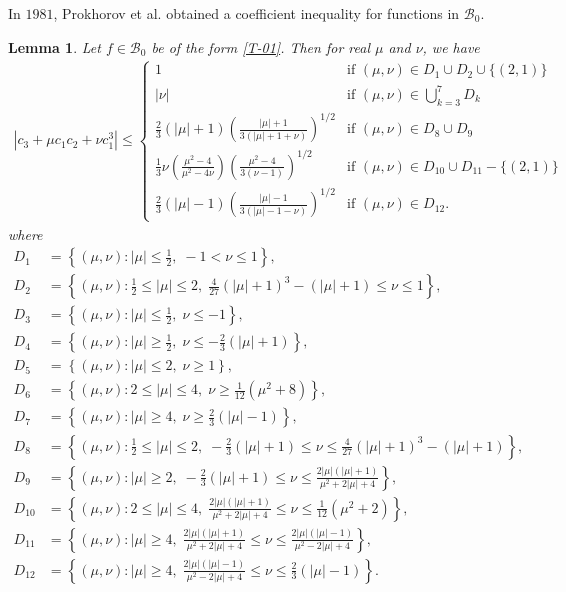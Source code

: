 \documentclass[a4paper,12pt]{amsart}
\newtheorem{lem}{Lemma}[section]
\theoremstyle{definition}
\begin{document}
In $1981$, Prokhorov et al. \cite{1981-Prokhorov-szynal} obtained a coefficient inequality for functions in $\mathcal{B}_0$.
\begin{lem}\label{T-34}\cite{1981-Prokhorov-szynal}
Let $f\in\mathcal{B}_0$ be of the form \eqref{T-01}. Then for real $\mu$ and $\nu$, we have
\begin{align*}
|c_3+\mu c_1c_2+\nu c_1^3|\le
\begin{cases} 
1 & \text{if } (\mu, \nu) \in D_1 \cup D_2 \cup \{ (2, 1) \} \\
|\nu| & \text{if } (\mu, \nu) \in \bigcup_{k=3}^{7} D_k \\
\frac{2}{3} \left( |\mu| + 1 \right) \left( \frac{|\mu| + 1}{3(|\mu| + 1 +\nu)} \right)^{1/2} & \text{if } (\mu, \nu) \in D_8 \cup D_9 \\
\frac{1}{3} \nu \left( \frac{\mu^2 - 4}{\mu^2 - 4\nu} \right) \left( \frac{\mu^2 - 4}{3(\nu - 1)} \right)^{1/2} & \text{if } (\mu, \nu) \in D_{10} \cup D_{11} - \{ (2, 1) \} \\
\frac{2}{3} \left( |\mu| - 1 \right) \left( \frac{|\mu| - 1}{3(|\mu| - 1 - \nu)} \right)^{1/2} & \text{if } (\mu, \nu) \in D_{12}.
\end{cases}
\end{align*}
where 
\allowdisplaybreaks
\begin{align*}
D_1 &= \left\{ (\mu, \nu): |\mu| \leq \frac{1}{2},\; -1 < \nu \leq 1 \right\}, \\
D_2 &= \left\{ (\mu, \nu): \frac{1}{2} \leq |\mu| \leq 2,\; \frac{4}{27} (|\mu| + 1)^3 - (|\mu| + 1) \leq \nu \leq 1 \right\}, \\
D_3 &= \left\{ (\mu, \nu): |\mu| \leq \frac{1}{2},\; \nu \leq -1 \right\}, \\
D_4 &= \left\{ (\mu, \nu): |\mu| \geq \frac{1}{2},\; \nu \leq -\frac{2}{3} (|\mu| + 1) \right\}, \\
D_5 &= \left\{ (\mu, \nu): |\mu| \leq 2,\; \nu \geq 1 \right\}, \\
D_6 &= \left\{ (\mu, \nu): 2 \leq |\mu| \leq 4,\; \nu \geq \frac{1}{12} (\mu^2 + 8) \right\}, \\
D_7 &= \left\{ (\mu, \nu): |\mu| \geq 4,\; \nu \geq \frac{2}{3} (|\mu| - 1) \right\}, \\
D_8 &= \left\{ (\mu, \nu): \frac{1}{2} \leq |\mu| \leq 2,\; -\frac{2}{3} (|\mu| + 1) \leq \nu \leq \frac{4}{27} (|\mu| + 1)^3 - (|\mu| + 1) \right\}, \\
D_9 &= \left\{ (\mu, \nu): |\mu| \geq 2,\; -\frac{2}{3} (|\mu| + 1) \leq \nu \leq \frac{2|\mu|(|\mu| + 1)}{\mu^2 + 2|\mu| + 4} \right\}, \\
D_{10} &= \left\{ (\mu, \nu): 2 \leq |\mu| \leq 4,\; \frac{2|\mu|(|\mu| + 1)}{\mu^2 + 2|\mu| + 4} \leq \nu \leq \frac{1}{12} (\mu^2 + 2) \right\}, \\
D_{11} &= \left\{ (\mu, \nu): |\mu| \geq 4,\; \frac{2|\mu|(|\mu| + 1)}{\mu^2 + 2|\mu| + 4} \leq \nu \leq \frac{2|\mu|(|\mu| - 1)}{\mu^2 - 2|\mu| + 4} \right\}, \\
D_{12} &= \left\{ (\mu, \nu): |\mu| \geq 4,\; \frac{2|\mu|(|\mu| - 1)}{\mu^2 - 2|\mu| + 4} \leq \nu \leq \frac{2}{3} (|\mu| - 1) \right\}.
\end{align*}


\end{lem}
\end{document}
